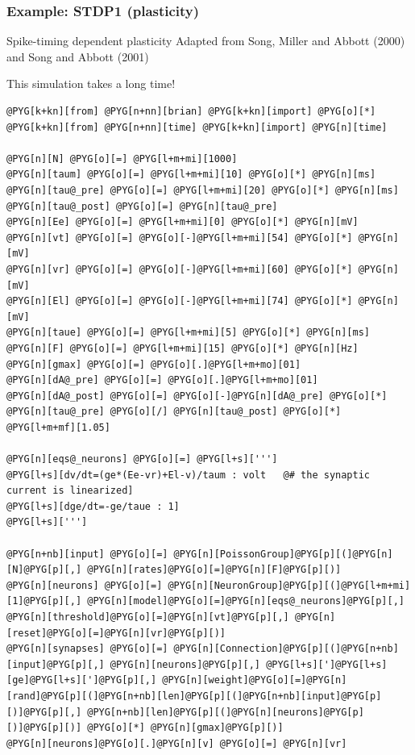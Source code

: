 \documentclass[letterpaper,10pt,english]{manual}
\begin{document}
\resetcurrentobjects
\hypertarget{--doc-examples-plasticity_STDP1}{}

\hypertarget{index-76}{}\subsubsection{Example: STDP1 (plasticity)}

Spike-timing dependent plasticity
Adapted from Song, Miller and Abbott (2000) and Song and Abbott (2001)

This simulation takes a long time!

\begin{Verbatim}[commandchars=@\[\]]
@PYG[k+kn][from] @PYG[n+nn][brian] @PYG[k+kn][import] @PYG[o][*]
@PYG[k+kn][from] @PYG[n+nn][time] @PYG[k+kn][import] @PYG[n][time]

@PYG[n][N] @PYG[o][=] @PYG[l+m+mi][1000]
@PYG[n][taum] @PYG[o][=] @PYG[l+m+mi][10] @PYG[o][*] @PYG[n][ms]
@PYG[n][tau@_pre] @PYG[o][=] @PYG[l+m+mi][20] @PYG[o][*] @PYG[n][ms]
@PYG[n][tau@_post] @PYG[o][=] @PYG[n][tau@_pre]
@PYG[n][Ee] @PYG[o][=] @PYG[l+m+mi][0] @PYG[o][*] @PYG[n][mV]
@PYG[n][vt] @PYG[o][=] @PYG[o][-]@PYG[l+m+mi][54] @PYG[o][*] @PYG[n][mV]
@PYG[n][vr] @PYG[o][=] @PYG[o][-]@PYG[l+m+mi][60] @PYG[o][*] @PYG[n][mV]
@PYG[n][El] @PYG[o][=] @PYG[o][-]@PYG[l+m+mi][74] @PYG[o][*] @PYG[n][mV]
@PYG[n][taue] @PYG[o][=] @PYG[l+m+mi][5] @PYG[o][*] @PYG[n][ms]
@PYG[n][F] @PYG[o][=] @PYG[l+m+mi][15] @PYG[o][*] @PYG[n][Hz]
@PYG[n][gmax] @PYG[o][=] @PYG[o][.]@PYG[l+m+mo][01]
@PYG[n][dA@_pre] @PYG[o][=] @PYG[o][.]@PYG[l+m+mo][01]
@PYG[n][dA@_post] @PYG[o][=] @PYG[o][-]@PYG[n][dA@_pre] @PYG[o][*] @PYG[n][tau@_pre] @PYG[o][/] @PYG[n][tau@_post] @PYG[o][*] @PYG[l+m+mf][1.05]

@PYG[n][eqs@_neurons] @PYG[o][=] @PYG[l+s][''']
@PYG[l+s][dv/dt=(ge*(Ee-vr)+El-v)/taum : volt   @# the synaptic current is linearized]
@PYG[l+s][dge/dt=-ge/taue : 1]
@PYG[l+s][''']

@PYG[n+nb][input] @PYG[o][=] @PYG[n][PoissonGroup]@PYG[p][(]@PYG[n][N]@PYG[p][,] @PYG[n][rates]@PYG[o][=]@PYG[n][F]@PYG[p][)]
@PYG[n][neurons] @PYG[o][=] @PYG[n][NeuronGroup]@PYG[p][(]@PYG[l+m+mi][1]@PYG[p][,] @PYG[n][model]@PYG[o][=]@PYG[n][eqs@_neurons]@PYG[p][,] @PYG[n][threshold]@PYG[o][=]@PYG[n][vt]@PYG[p][,] @PYG[n][reset]@PYG[o][=]@PYG[n][vr]@PYG[p][)]
@PYG[n][synapses] @PYG[o][=] @PYG[n][Connection]@PYG[p][(]@PYG[n+nb][input]@PYG[p][,] @PYG[n][neurons]@PYG[p][,] @PYG[l+s][']@PYG[l+s][ge]@PYG[l+s][']@PYG[p][,] @PYG[n][weight]@PYG[o][=]@PYG[n][rand]@PYG[p][(]@PYG[n+nb][len]@PYG[p][(]@PYG[n+nb][input]@PYG[p][)]@PYG[p][,] @PYG[n+nb][len]@PYG[p][(]@PYG[n][neurons]@PYG[p][)]@PYG[p][)] @PYG[o][*] @PYG[n][gmax]@PYG[p][)]
@PYG[n][neurons]@PYG[o][.]@PYG[n][v] @PYG[o][=] @PYG[n][vr]


\end{Verbatim}
\end{document}
